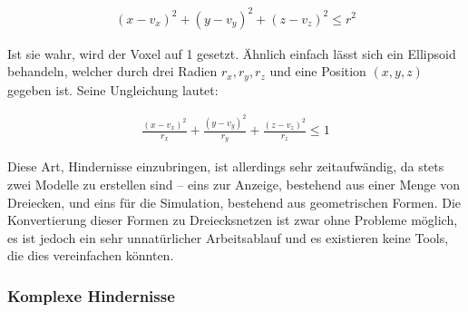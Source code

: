 \begin{align}
(x-v_x)^2 + (y-v_y)^2 + (z-v_z)^2 \leq r^2
\end{align}

Ist sie wahr, wird der Voxel auf 1 gesetzt. Ähnlich einfach lässt sich
ein Ellipsoid behandeln, welcher durch drei Radien $r_x,r_y,r_z$ und eine
Position $(x,y,z)$ gegeben ist. Seine Ungleichung lautet:

\begin{align}
\frac{(x-v_x)^2}{r_x} + \frac{(y-v_y)^2}{r_y} + \frac{(z-v_z)^2}{r_z} \leq 1
\end{align}

Diese Art, Hindernisse einzubringen, ist allerdings sehr
zeitaufwändig, da stets zwei Modelle zu erstellen sind -- eins zur
Anzeige, bestehend aus einer Menge von Dreiecken, und eins für die
Simulation, bestehend aus geometrischen Formen. Die Konvertierung dieser
Formen zu Dreiecksnetzen ist zwar ohne Probleme möglich, es ist jedoch
ein sehr unnatürlicher Arbeitsablauf und es existieren keine Tools,
die dies vereinfachen könnten.

\subsubsection{Komplexe Hindernisse}


